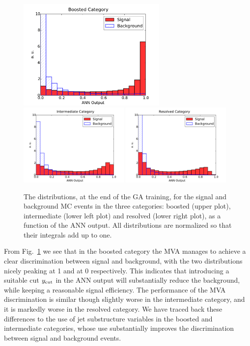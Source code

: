 \begin{figure}[t]
\begin{center}
\includegraphics[width=0.65\textwidth]{plots/Boosted_disc_noPU.pdf}
\includegraphics[width=0.48\textwidth]{plots/Intermediate_disc_noPU.pdf}
\includegraphics[width=0.48\textwidth]{plots/Resolved_disc_noPU.pdf}
\caption{\small The distributions, at the end of the
  GA training, 
  for the signal and background MC events in the three categories:
  boosted (upper plot), intermediate (lower left plot) and
  resolved (lower right plot), as a function of the ANN output.
  All distributions are normalized so that their integrals
  add up to one.
}
\label{fig:nnresponse}
\end{center}
\end{figure}

From Fig.~\ref{fig:nnresponse} we see that in the boosted category the MVA manages
to achieve a clear discrimination between signal and background, with the two distributions
nicely peaking at 1 and at 0 respectively.
%
This indicates that introducing a suitable cut
$y_{\rm cut}$
in the ANN output will substantially reduce the background,
while keeping a reasonable signal efficiency.
%
The performance of the MVA discrimination is similar though slightly worse in the intermediate
category, and it is markedly worse in the resolved category.
%
We have traced back these differences to the use of jet substructure variables
in the boosted and intermediate categories, whose use substantially
improves the
discrimination between signal and background events.



